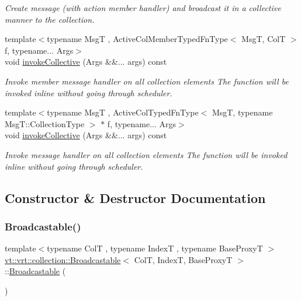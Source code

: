 \begin{DoxyCompactItemize}
\begin{DoxyCompactList}\small\item\em Create message (with action member handler) and broadcast it in a collective manner to the collection. \end{DoxyCompactList}\item 
{\footnotesize template$<$typename MsgT , Active\+Col\+Member\+Typed\+Fn\+Type$<$ Msg\+T, Col\+T $>$ f, typename... Args$>$ }\\void \hyperlink{structvt_1_1vrt_1_1collection_1_1_broadcastable_a3acc97a928f8d184e54d696e49377008}{invoke\+Collective} (Args \&\&... args) const
\begin{DoxyCompactList}\small\item\em Invoke member message handler on all collection elements The function will be invoked inline without going through scheduler. \end{DoxyCompactList}\item 
{\footnotesize template$<$typename MsgT , Active\+Col\+Typed\+Fn\+Type$<$ Msg\+T, typename Msg\+T\+::\+Collection\+Type $>$ $\ast$ f, typename... Args$>$ }\\void \hyperlink{structvt_1_1vrt_1_1collection_1_1_broadcastable_a3acc97a928f8d184e54d696e49377008}{invoke\+Collective} (Args \&\&... args) const
\begin{DoxyCompactList}\small\item\em Invoke message handler on all collection elements The function will be invoked inline without going through scheduler. \end{DoxyCompactList}\end{DoxyCompactItemize}


\subsection{Constructor \& Destructor Documentation}
\mbox{\label{structvt_1_1vrt_1_1collection_1_1_broadcastable_afc16bdb399c4a846fd741062d995a339}} 
\subsubsection{\texorpdfstring{Broadcastable()}{Broadcastable()}\hspace{0.1cm}{\footnotesize\ttfamily [1/4]}}
{\footnotesize\ttfamily template$<$typename ColT , typename IndexT , typename Base\+ProxyT $>$ \\
\hyperlink{structvt_1_1vrt_1_1collection_1_1_broadcastable}{vt\+::vrt\+::collection\+::\+Broadcastable}$<$ ColT, IndexT, Base\+ProxyT $>$\+::\hyperlink{structvt_1_1vrt_1_1collection_1_1_broadcastable}{Broadcastable} (\begin{DoxyParamCaption}{ }\end{DoxyParamCaption})\hspace{0.3cm}{\ttfamily [default]}}

